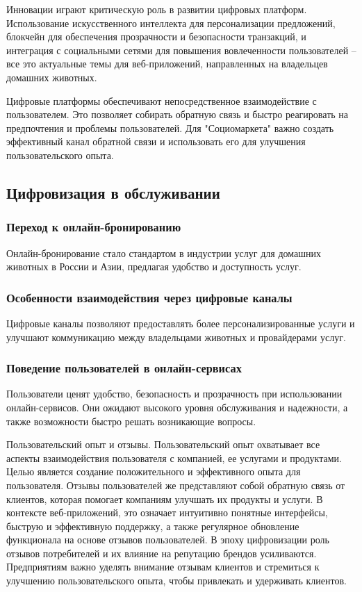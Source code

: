 Инновации играют критическую роль в развитии цифровых платформ. Использование искусственного интеллекта для персонализации предложений, блокчейн для обеспечения прозрачности и безопасности транзакций, и интеграция с социальными сетями для повышения вовлеченности пользователей – все это актуальные темы для веб-приложений, направленных на владельцев домашних животных.

Цифровые платформы обеспечивают непосредственное взаимодействие с пользователем. Это позволяет собирать обратную связь и быстро реагировать на предпочтения и проблемы пользователей. Для "Социомаркета" важно создать эффективный канал обратной связи и использовать его для улучшения пользовательского опыта.
\subsection{Цифровизация в обслуживании}
\subsubsection{Переход к онлайн-бронированию}

Онлайн-бронирование стало стандартом в индустрии услуг для домашних животных в России и Азии, предлагая удобство и доступность услуг.
\subsubsection{Особенности взаимодействия через цифровые каналы}

Цифровые каналы позволяют предоставлять более персонализированные услуги и улучшают коммуникацию между владельцами животных и провайдерами услуг.
\subsubsection{Поведение пользователей в онлайн-сервисах}

Пользователи ценят удобство, безопасность и прозрачность при использовании онлайн-сервисов. Они ожидают высокого уровня обслуживания и надежности, а также возможности быстро решать возникающие вопросы.

Пользовательский опыт и отзывы. Пользовательский опыт охватывает все аспекты взаимодействия пользователя с компанией, ее услугами и продуктами. Целью является создание положительного и эффективного опыта для пользователя. Отзывы пользователей же представляют собой обратную связь от клиентов, которая помогает компаниям улучшать их продукты и услуги. В контексте веб-приложений, это означает интуитивно понятные интерфейсы, быструю и эффективную поддержку, а также регулярное обновление функционала на основе отзывов пользователей. В эпоху цифровизации роль отзывов потребителей и их влияние на репутацию брендов усиливаются. Предприятиям важно уделять внимание отзывам клиентов и стремиться к улучшению пользовательского опыта, чтобы привлекать и удерживать клиентов.

